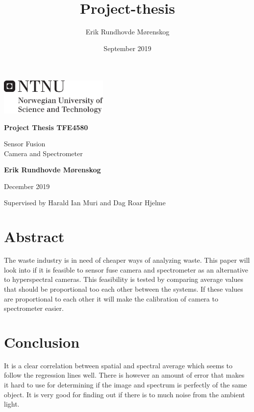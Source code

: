 \documentclass{article}
\title{Project-thesis}
\author{Erik Rundhovde M\o renskog}
\date{September 2019}
\begin{document}
\begin{titlepage}
    
    \includegraphics[width=0.4\textwidth]{figures/ntnu_hovedlogo_eng_svart.png}
    
    \vspace{1cm}
    \huge
    
    \textbf{Project Thesis TFE4580}
 
    \vspace{0.5cm}
    
    Sensor Fusion \\ 
    Camera and Spectrometer
 
    \vspace{1.5cm}
    \Large
    
    \textbf{Erik Rundhovde M\o renskog}

    \vfill

    December 2019
    
    \vspace{0.5cm}

    Supervised by Harald Ian Muri and Dag Roar Hjelme
\end{titlepage}

\singlespacing
\tableofcontents

\section{Abstract}
The waste industry is in need of cheaper ways of analyzing waste. This paper will look into if it is feasible to sensor fuse camera and spectrometer as an alternative to hyperspectral cameras. This feasibility is tested by comparing average values that should be proportional too each other between the systems. If these values are proportional to each other it will make the calibration of camera to spectrometer easier. 











\section{Conclusion}

It is a clear correlation between spatial and spectral average which seems to follow the regression lines well. There is however an amount of error that makes it hard to use for determining if the image and spectrum is perfectly of the same object. It is very good for finding out if there is to much noise from the ambient light.  





\end{document}
